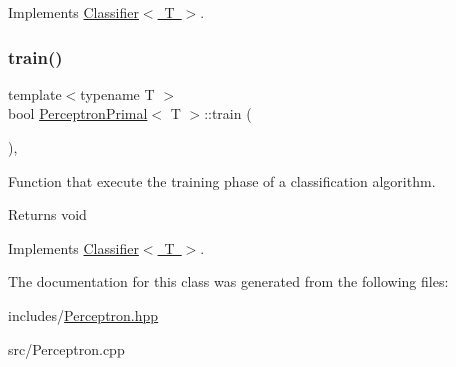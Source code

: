 Implements \mbox{\hyperlink{class_classifier_ab3b9544a8d9c3cbde8d5865c7e9be0fb}{Classifier$<$ T $>$}}.

\mbox{\label{class_perceptron_primal_ac6cafe7a8fabfb607761024ce60a6861}} 
\subsubsection{\texorpdfstring{train()}{train()}}
{\footnotesize\ttfamily template$<$typename T $>$ \\
bool \mbox{\hyperlink{class_perceptron_primal}{Perceptron\+Primal}}$<$ T $>$\+::train (\begin{DoxyParamCaption}{ }\end{DoxyParamCaption})\hspace{0.3cm}{\ttfamily [override]}, {\ttfamily [virtual]}}



Function that execute the training phase of a classification algorithm. 

\begin{DoxyReturn}{Returns}
void 
\end{DoxyReturn}


Implements \mbox{\hyperlink{class_classifier_a120849bfdfa3ba7a0388b32b2d76bf4f}{Classifier$<$ T $>$}}.



The documentation for this class was generated from the following files\+:\begin{DoxyCompactItemize}
\item 
includes/\mbox{\hyperlink{_perceptron_8hpp}{Perceptron.\+hpp}}\item 
src/Perceptron.\+cpp\end{DoxyCompactItemize}
